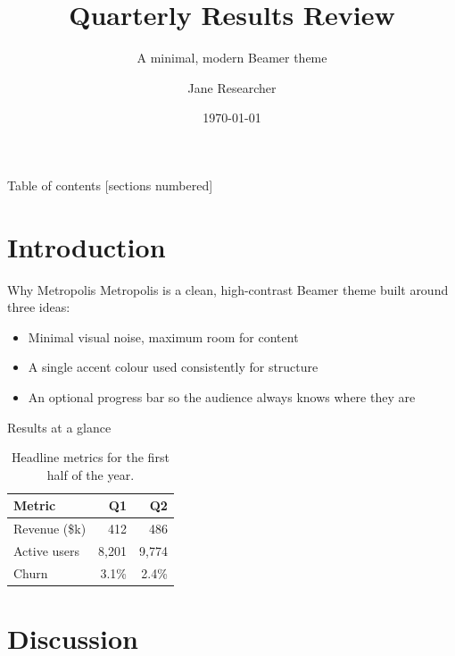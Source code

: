 \documentclass[10pt]{beamer}
\title{Quarterly Results Review}
\subtitle{A minimal, modern Beamer theme}
\date{\today}
\author{Jane Researcher}
\institute{Department of Computer Science}
\begin{document}
\maketitle

\begin{frame}{Table of contents}
  [sections numbered]
  \tableofcontents[hideallsubsections]
\end{frame}

\section{Introduction}

\begin{frame}{Why Metropolis}
  Metropolis is a clean, high-contrast Beamer theme built around three ideas:
  \begin{itemize}
    \item Minimal visual noise, maximum room for content
    \item A single accent colour used consistently for structure
    \item An optional progress bar so the audience always knows where they are
  \end{itemize}
\end{frame}

\begin{frame}{Results at a glance}
  \begin{table}
    \centering
    \begin{tabular}{lrr}
      \toprule
      Metric & Q1 & Q2 \\
      \midrule
      Revenue (\$k) & 412 & 486 \\
      Active users & 8{,}201 & 9{,}774 \\
      Churn & 3.1\% & 2.4\% \\
      \bottomrule
    \end{tabular}
    \caption{Headline metrics for the first half of the year.}
  \end{table}
\end{frame}

\section{Discussion}
\end{document}
